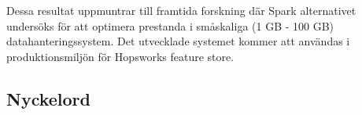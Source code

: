 \begin{scontents}[store-env=abstracts,print-env=true]
Dessa resultat uppmuntrar till framtida forskning där Spark alternativet undersöks för att optimera prestanda i småskaliga (1 GB - 100 GB) datahanteringssystem. Det utvecklade systemet kommer att användas i produktionsmiljön för Hopsworks feature store.


\end{scontents}
\subsection*{Nyckelord}
\begin{scontents}[store-env=keywords,print-env=true]
\end{scontents}